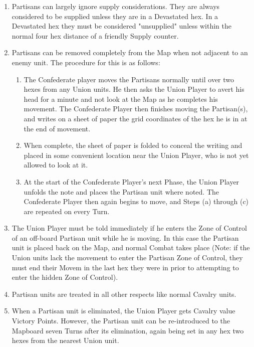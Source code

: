 \begin{enumerate}
  \item Partisans can largely ignore supply considerations. They are always considered to be supplied unless they are in a Devastated hex. In a Devastated hex they must be considered "unsupplied" unless within the normal four hex distance of a friendly Supply counter.

  \item Partisans can be removed completely from the Map when not adjacent to an enemy unit. The procedure for this is as follows:

  \begin{enumerate}[label=(\alph*)]
    \item The Confederate player moves the Partisans normally until over two hexes from any Union units. He then asks the Union Player to avert his head for a minute and not look at the Map as he completes his movement. The Confederate Player then finishes moving the Partisan(s), and writes on a sheet of paper the grid coordinates of the hex he is in at the end of movement.

    \item When complete, the sheet of paper is folded to conceal the writing and placed in some convenient location near the Union Player, who is not yet allowed to look at it.

    \item At the start of the Confederate Player's next Phase, the Union Player unfolds the note and places the Partisan unit where noted. The Confederate Player then again begins to move, and Steps (a) through (c) are repeated on every Turn.
  \end{enumerate}

  \item The Union Player must be told immediately if he enters the Zone of Control of an off-board Partisan unit while he is moving. In this case the Partisan unit is placed back on the Map, and normal Combat takes place (Note: if the Union units lack the movement to enter the Partisan Zone of Control, they must end their Movem in the last hex they were in prior to attempting to enter the hidden Zone of Control).

  \item Partisan units are treated in all other respects like normal Cavalry units.

  \item When a Partisan unit is eliminated, the Union Player gets Cavalry value Victory Points. However, the Partisan unit can be re-introduced to the Mapboard seven Turns after its elimination, again being set in any hex two hexes from the nearest Union unit.
\end{enumerate}